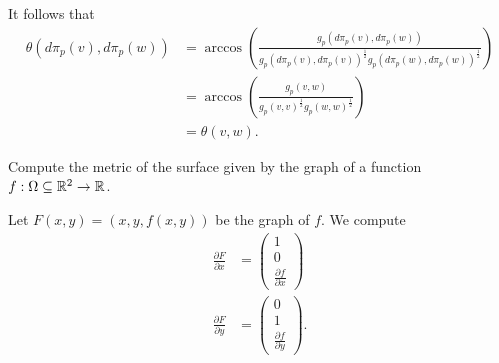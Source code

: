 \documentclass[12pt]{article}
\begin{document}
It follows that
\begin{align*}
	\theta (d\pi_p(v),d\pi_p(w) ) &= \arccos \left( \frac{g_p(d\pi_p(v),d\pi_p(w))}{ g_p(d\pi_p(v),d\pi_p(v))^{\frac{1}{2}} g_p(d\pi_p(w),d\pi_p(w))^{\frac{1}{2}} } \right)  \\
	 &= \arccos \left( \frac{g_p(v,w)}{ g_p(v,v)^{\frac{1}{2}} g_p(w,w)^{\frac{1}{2}} } \right)  \\
	 &= \theta(v,w) .
\end{align*}

\begin{problem}[LN12 0.3.2]
Compute the metric of the surface given by the graph of a function $ f: \Omega \subseteq \mathbb{R}^2 \to \mathbb{R}$.
\end{problem}
Let $ F(x,y) = (x,y,f(x,y))$ be the graph of  $ f$. We compute
\begin{align*}
	\frac{\partial F}{\partial x} &= \begin{pmatrix} 1\\0\\ \frac{\partial f}{\partial x}  \end{pmatrix} \\
	\frac{\partial F}{\partial y} &= \begin{pmatrix} 0\\1\\ \frac{\partial f}{\partial y}  \end{pmatrix}  .
\end{align*}
\end{document}

